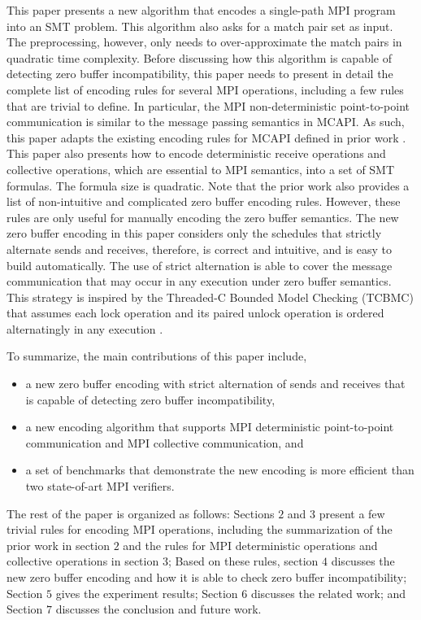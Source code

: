 This paper presents a new algorithm that encodes a single-path MPI program into an SMT problem. This algorithm also asks for a match pair set as input. The preprocessing, however, only needs to over-approximate the match pairs in quadratic time complexity. Before discussing how this algorithm is capable of detecting zero buffer incompatibility, this paper needs to present in detail the complete list of encoding rules for several MPI operations, including a few rules that are trivial to define.  In particular, the MPI non-deterministic point-to-point communication is similar to the message passing semantics in MCAPI. As such, this paper adapts the existing encoding rules for MCAPI defined in prior work \cite{DBLP:conf/kbse/HuangMM13}. This paper also presents how to encode deterministic receive operations and collective operations, which are essential to MPI semantics, into a set of SMT formulas. The formula size is quadratic. Note that the prior work also provides a list of non-intuitive and complicated zero buffer encoding rules. However, these rules are only useful for manually encoding the zero buffer semantics. The new zero buffer encoding in this paper considers only the schedules that strictly alternate sends and receives, therefore, is correct and intuitive, and is easy to build automatically. The use of strict alternation is able to cover the message communication that may occur in any execution under zero buffer semantics. This strategy is inspired by the Threaded-C Bounded Model Checking (TCBMC) that assumes each lock operation and its paired unlock operation is ordered alternatingly in any execution \cite{DBLP:conf/cav/RabinovitzG05}. 

To summarize, the main contributions of this paper include,
\begin{itemize}
\item a new zero buffer encoding with strict alternation of sends and receives that is capable of detecting zero buffer incompatibility, 
\item a new encoding algorithm that supports MPI deterministic point-to-point communication and MPI collective communication, and
\item a set of benchmarks that demonstrate the new encoding is more efficient than two state-of-art MPI verifiers.
\end{itemize}

The rest of the paper is organized as follows: 
Sections $2$ and $3$ present a few trivial rules for encoding MPI operations, including the summarization of the prior work \cite{DBLP:conf/kbse/HuangMM13} in section $2$ and the rules for MPI deterministic operations and collective operations in section $3$; Based on these rules, section $4$ discusses the new zero buffer encoding and how it is able to check zero buffer incompatibility; Section $5$ gives the experiment results; Section $6$ discusses the related work; and Section $7$ discusses the conclusion and future work.



           
